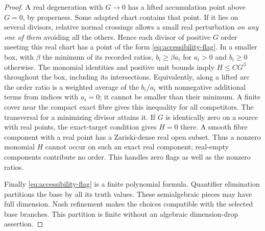 \begin{proof}
A real degeneration with $G\to0$ has a lifted accumulation point above
$G=0$, by properness. Some adapted chart contains that point. If it lies
on several divisors, relative normal crossings allows a small real
perturbation \emph{on any one of them} avoiding all the others. Hence
each divisor of positive $G$ order meeting this real chart has a point
of the form \eqref{eq:accessibility-flag}. In a smaller box, with
$\beta$ the minimum of its recorded ratios, $b_i\ge\beta a_i$ for
$a_i>0$ and $b_i\ge0$ otherwise. The monomial identities and positive
unit bounds imply $H\le C G^\beta$ throughout the box, including its
intersections. Equivalently, along a lifted arc the order ratio is a
weighted average of the $b_i/a_i$ with nonnegative additional terms
from indices with $a_i=0$; it cannot be smaller than their minimum.
A finite cover near the compact exact fibre gives this inequality for
all competitors. The transversal for a minimizing divisor attains it.
If $G$ is identically zero on a source with real points, the exact-target
condition gives $H=0$ there. A smooth fibre component with a real point
has a Zariski-dense real open subset. Thus a nonzero monomial $H$ cannot
occur on such an exact real component; real-empty components contribute
no order. This handles zero flags as well as the nonzero ratios.

Finally \eqref{eq:accessibility-flag} is a finite polynomial formula.
Quantifier elimination partitions the base by all its truth values.
These semialgebraic pieces may have full dimension. Nash refinement
makes the choices compatible with the selected base branches. This
partition is finite without an algebraic dimension-drop assertion.
\end{proof}

